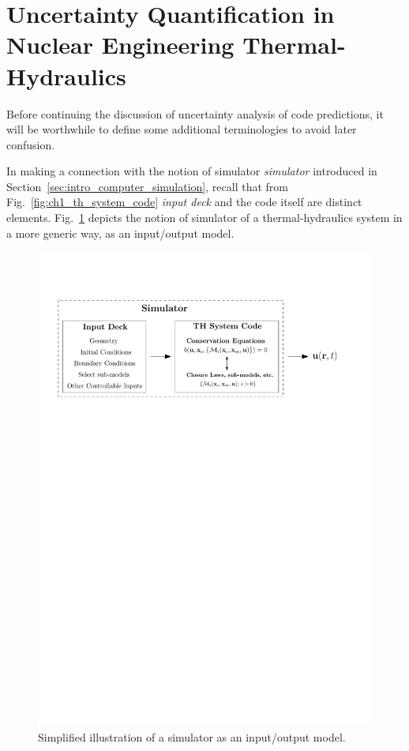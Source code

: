 \section{Uncertainty Quantification in Nuclear Engineering Thermal-Hydraulics}\label{sec:intro_uncertainty_quantification}

Before continuing the discussion of uncertainty analysis of code predictions, it will be worthwhile to define some additional terminologies to avoid later confusion.

In making a connection with the notion of simulator \emph{simulator} introduced in Section~\ref{sec:intro_computer_simulation}, 
recall that from Fig.~\ref{fig:ch1_th_system_code} \emph{input deck} and the code itself are distinct elements.
Fig.~\ref{fig:ch1_simulator_io} depicts the notion of simulator of a thermal-hydraulics system in a more generic way, as an input/output model.
\begin{figure}[bth]	
	\centering
	\includegraphics[width=\textwidth]{../figures/chapter1/figures/simulator_io}
	\caption[Simplified illustration of a simulator as an input/output model]{Simplified illustration of a simulator as an input/output model.}
	\label{fig:ch1_simulator_io}
\end{figure}
